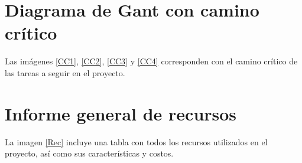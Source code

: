\documentclass[11pt,a4paper,spanish,twoside]{book}
\begin{document}
\begin{sidewaystable}
\end{sidewaystable}

\begin{sidewaystable}
\end{sidewaystable}

\begin{sidewaystable}
\end{sidewaystable}

\begin{sidewaystable}
\end{sidewaystable}

\section{Diagrama de Gant con camino crítico}
Las imágenes \ref{CC1}, \ref{CC2}, \ref{CC3} y \ref{CC4} corresponden con el
camino crítico de las tareas a seguir en el proyecto.

\begin{sidewaystable}
\end{sidewaystable}

\begin{sidewaystable}
\end{sidewaystable}

\begin{sidewaystable}
\end{sidewaystable}

\begin{sidewaystable}
\end{sidewaystable}

\section{Informe general de recursos}
La imagen \ref{Rec} incluye una tabla con todos los recursos utilizados en el
proyecto, así como sus características y costos.
\begin{sidewaystable}
\end{sidewaystable}
\end{document}
